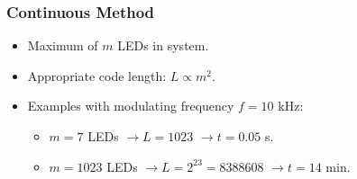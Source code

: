 \documentclass{beamer}
\begin{document}
\begin{frame}







	\end{frame}





	\begin{frame}\frametitle{Continuous Method}


		\begin{itemize}
			
			\item Maximum of $m$ LEDs in system.
			\item Appropriate code length: $L \propto m^2$.

			\item Examples with modulating frequency $f = 10$ kHz:
			\begin{itemize}


				\item $m = 7$ LEDs $\rightarrow L = 1023$ $\rightarrow t = 0.05$ s.
				\item $m = 1023$ LEDs $\rightarrow L = 2^{23} = 8388608$ $\rightarrow t = 14$ min.
			\end{itemize}
		\end{itemize}


	\end{frame}
\end{document}
